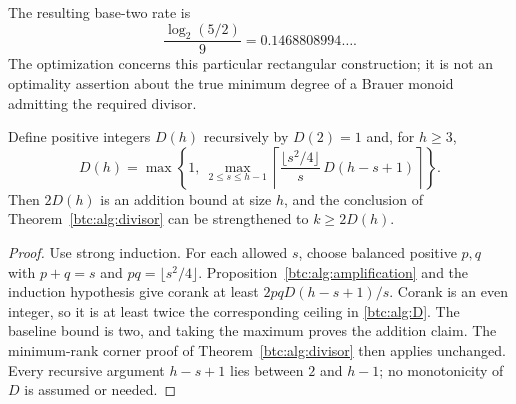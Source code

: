 The resulting base-two rate is
\[
 \frac{\log_2(5/2)}9=0.1468808994\ldots.
\]
The optimization concerns this particular rectangular construction;
it is not an optimality assertion about the true minimum degree of
a Brauer monoid admitting the required divisor.

\begin{proposition}\label{btc:alg:finite-recurrence}
Define positive integers $D(h)$ recursively by $D(2)=1$ and, for
$h\ge3$,
\begin{equation}\label{btc:alg:D}
 D(h)=\max\left\{1,\ \max_{2\le s\le h-1}
 \left\lceil\frac{\lfloor s^2/4\rfloor}{s}\,
 D(h-s+1)\right\rceil\right\}.
\end{equation}
Then $2D(h)$ is an addition bound at size $h$, and the conclusion
of Theorem~\ref{btc:alg:divisor} can be strengthened to $k\ge2D(h)$.
\end{proposition}

\begin{proof}
Use strong induction. For each allowed $s$, choose balanced positive
$p,q$ with $p+q=s$ and $pq=\lfloor s^2/4\rfloor$.
Proposition~\ref{btc:alg:amplification} and the induction hypothesis
give corank at least $2pqD(h-s+1)/s$. Corank is an even integer,
so it is at least twice the corresponding ceiling in
\eqref{btc:alg:D}. The baseline bound is two, and taking the maximum
proves the addition claim. The minimum-rank corner proof of
Theorem~\ref{btc:alg:divisor} then applies unchanged.
Every recursive argument $h-s+1$ lies between $2$ and $h-1$;
no monotonicity of $D$ is assumed or needed.
\end{proof}

